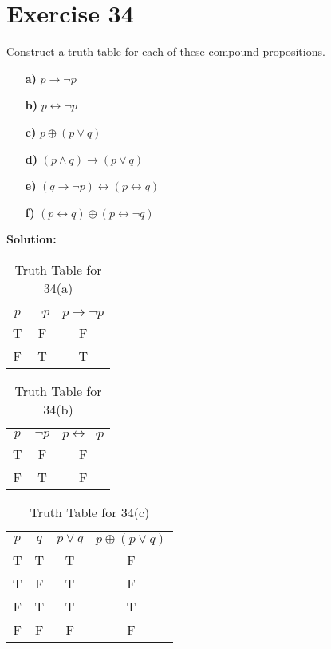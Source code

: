 \documentclass{Axon}
\begin{document}
\section*{Exercise 34}
Construct a truth table for each of these compound propositions.
\begin{itemize}
    \item[\textbf{a)}] \(p \to \lnot p\)
    \item[\textbf{b)}] \(p \leftrightarrow \lnot p\)
    \item[\textbf{c)}] \(p \oplus (p \lor q)\)
    \item[\textbf{d)}] \((p \land q) \to (p \lor q)\)
    \item[\textbf{e)}] \((q \to \lnot p) \leftrightarrow (p \leftrightarrow q)\)
    \item[\textbf{f)}] \((p \leftrightarrow q) \oplus (p \leftrightarrow \lnot q)\)
\end{itemize}

\noindent
\textbf{Solution:}
\begin{table}[ht]
    \centering
    \begin{tabular}{c|c|c}
        \(p\) & \(\lnot p\) & \(p \to \lnot p\) \\
        T     & F           & F                 \\
        F     & T           & T
    \end{tabular}
    \caption{Truth Table for 34(a)}
\end{table}

\begin{table}[ht]
    \centering
    \begin{tabular}{c|c|c}
        \(p\) & \(\lnot p\) & \(p \leftrightarrow \lnot p\) \\
        T     & F           & F                             \\
        F     & T           & F
    \end{tabular}
    \caption{Truth Table for 34(b)}
\end{table}

\begin{table}[ht]
    \centering
    \begin{tabular}{c|c|c|c}
    \(p\) & \(q\) & \(p \lor q\) & \(p \oplus (p \lor q)\) \\
    T     & T     & T            & F                       \\
    T     & F     & T            & F                       \\
    F     & T     & T            & T                       \\
    F     & F     & F            & F
    \end{tabular}
    \caption{Truth Table for 34(c)}
\end{table}
\end{document}

